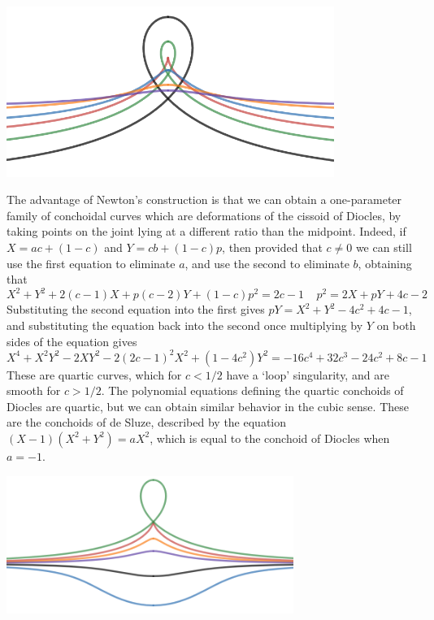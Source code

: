 \begin{example}
    \begin{center}
        \includegraphics[width=0.8\textwidth]{algebraicGeometryConchoidDiocles2}
    \end{center}

    The advantage of Newton's construction is that we can obtain a one-parameter family of conchoidal curves which are deformations of the cissoid of Diocles, by taking points on the joint lying at a different ratio than the midpoint. Indeed, if $X = ac + (1 - c)$ and $Y = cb + (1-c)p$, then provided that $c \neq 0$ we can still use the first equation to eliminate $a$, and use the second to  eliminate $b$, obtaining that
    \[ X^2 + Y^2 + 2(c-1)X + p(c-2)Y + (1 - c)p^2 = 2c - 1\ \ \ \ \  p^2 = 2X + pY + 4c - 2 \]
    Substituting the second equation into the first gives $pY = X^2 + Y^2 - 4c^2 + 4c - 1$, and substituting the equation back into the second once multiplying by $Y$ on both sides of the equation gives
    \[ X^4 + X^2Y^2  - 2XY^2 - 2(2c-1)^2X^2 + (1 - 4c^2)Y^2 = -16c^4 + 32c^3 - 24c^2 + 8c - 1 \]
    These are quartic curves, which for $c < 1/2$ have a `loop' singularity, and are smooth for $c > 1/2$. The polynomial equations defining the quartic conchoids of Diocles are quartic, but we can obtain similar behavior in the cubic sense. These are the conchoids of de Sluze, described by the equation $(X-1)(X^2 + Y^2) = aX^2$, which is equal to the conchoid of Diocles when $a = -1$.
    \begin{center}
        \includegraphics[width=0.7\textwidth]{algebraicGeometryConchoidDesluze}
    \end{center}
\end{example}

